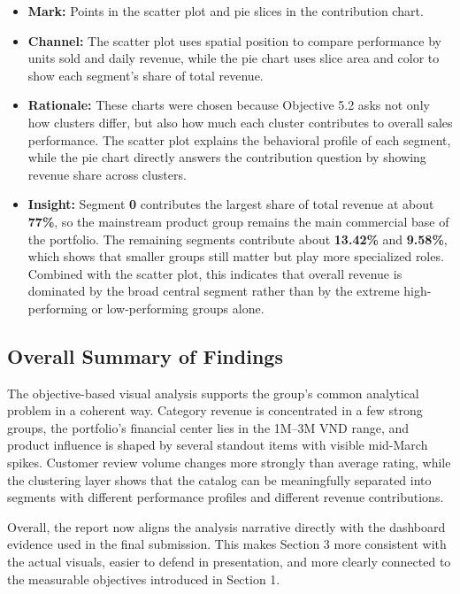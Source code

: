 \begin{itemize}[leftmargin=*, label=\textbullet]
    \item \textbf{Mark:} Points in the scatter plot and pie slices in the contribution chart.
    \item \textbf{Channel:} The scatter plot uses spatial position to compare performance by units sold and daily revenue, while the pie chart uses slice area and color to show each segment's share of total revenue.
    \item \textbf{Rationale:} These charts were chosen because Objective 5.2 asks not only how clusters differ, but also how much each cluster contributes to overall sales performance. The scatter plot explains the behavioral profile of each segment, while the pie chart directly answers the contribution question by showing revenue share across clusters.
    \item \textbf{Insight:} Segment \textbf{0} contributes the largest share of total revenue at about \textbf{77\%}, so the mainstream product group remains the main commercial base of the portfolio. The remaining segments contribute about \textbf{13.42\%} and \textbf{9.58\%}, which shows that smaller groups still matter but play more specialized roles. Combined with the scatter plot, this indicates that overall revenue is dominated by the broad central segment rather than by the extreme high-performing or low-performing groups alone.
\end{itemize}

\subsection{Overall Summary of Findings}

The objective-based visual analysis supports the group's common analytical problem in a coherent way. Category revenue is concentrated in a few strong groups, the portfolio's financial center lies in the 1M--3M VND range, and product influence is shaped by several standout items with visible mid-March spikes. Customer review volume changes more strongly than average rating, while the clustering layer shows that the catalog can be meaningfully separated into segments with different performance profiles and different revenue contributions.

Overall, the report now aligns the analysis narrative directly with the dashboard evidence used in the final submission. This makes Section 3 more consistent with the actual visuals, easier to defend in presentation, and more clearly connected to the measurable objectives introduced in Section 1.
